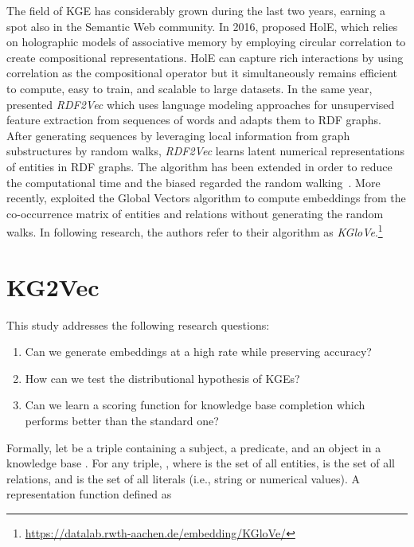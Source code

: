 \documentclass[graybox]{archivesofdatascience}
\newcommand{\ktvplain}{KG2Vec\xspace}
\newcommand{\rtv}{\textit{RDF2Vec}\xspace}
\newcommand{\kgl}{\textit{KGloVe}\xspace}
\begin{document}
The field of KGE has considerably grown during the last two years, earning a spot also in the Semantic Web community. 
In 2016, \cite{nickel2016holographic} proposed HolE, which relies on holographic models of associative memory by employing circular correlation to create compositional representations. 
HolE can capture rich interactions by using correlation as the compositional operator but it simultaneously remains efficient to compute, easy to train, and scalable to large datasets. 
In the same year, \cite{ristoski2016rdf2vec} presented \rtv which uses language modeling approaches for unsupervised feature extraction from sequences of words and adapts them to RDF graphs. 
After generating sequences by leveraging local information from graph substructures by random walks, \rtv learns latent numerical representations of entities in RDF graphs.
The algorithm has been extended in order to reduce the computational time and the biased regarded the random walking~\citep{cochez2017biased}.
More recently, \cite{cochez2017global} exploited the Global Vectors algorithm to compute embeddings from the co-occurrence matrix of entities and relations without generating the random walks.
In following research, the authors refer to their algorithm as \kgl.\footnote{\url{https://datalab.rwth-aachen.de/embedding/KGloVe/}}







\section{\ktvplain} \label{sec:core}

This study addresses the following research questions:

\begin{enumerate}
    \item Can we generate embeddings at a high rate while preserving accuracy?
    \item How can we test the distributional hypothesis of KGEs?
    \item Can we learn a scoring function for knowledge base completion which performs better than the standard one?
\end{enumerate}



Formally, let  be a triple containing a subject, a predicate, and an object in a knowledge base .
For any triple, , where  is the set of all entities,  is the set of all relations, and  is the set of all literals (i.e., string or numerical values).
A representation function  defined as
\end{document}
